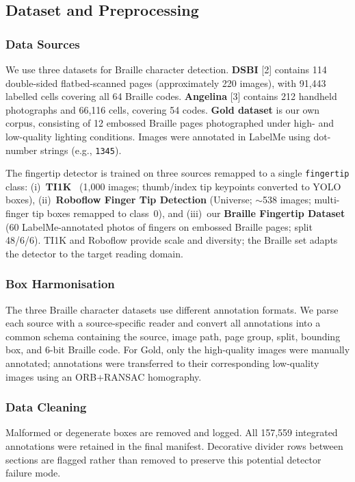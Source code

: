\documentclass{article}
\begin{document}
\subsection{Dataset and Preprocessing}

\subsubsection{Data Sources}
We use three datasets for Braille character detection. \textbf{DSBI} [2] contains 114 double-sided flatbed-scanned pages (approximately 220 images), with 91,443 labelled cells covering all 64 Braille codes. \textbf{Angelina} [3] contains 212 handheld photographs and 66,116 cells, covering 54 codes. \textbf{Gold dataset} is our own corpus, consisting of 12 embossed Braille pages photographed under high- and low-quality lighting conditions. Images were annotated in LabelMe using dot-number strings (e.g., \texttt{1345}). 

The fingertip detector is trained on three sources remapped to a single
\texttt{fingertip} class: (i)~\textbf{TI1K}~\cite{alam2019ti1k} (1,000 images;
thumb/index tip keypoints converted to YOLO boxes),
(ii)~\textbf{Roboflow Finger Tip Detection} (Universe; $\sim$538 images;
multi-finger tip boxes remapped to class~0), and (iii)~our
\textbf{Braille Fingertip Dataset} (60 LabelMe-annotated photos of fingers
on embossed Braille pages; split 48/6/6).  TI1K and Roboflow provide scale
and diversity; the Braille set adapts the detector to the target
reading domain.

\subsubsection{Box Harmonisation}
The three Braille character datasets use different annotation formats. We parse each source with a source-specific reader and convert all annotations into a common schema containing the source, image path, page group, split, bounding box, and 6-bit Braille code. For Gold, only the high-quality images were manually annotated; annotations were transferred to their corresponding low-quality images using an ORB+RANSAC homography.

\subsubsection{Data Cleaning}
Malformed or degenerate boxes are removed and logged. All 157,559 integrated annotations were retained in the final manifest. Decorative divider rows between sections are flagged rather than removed to preserve this potential detector failure mode.
\end{document}
